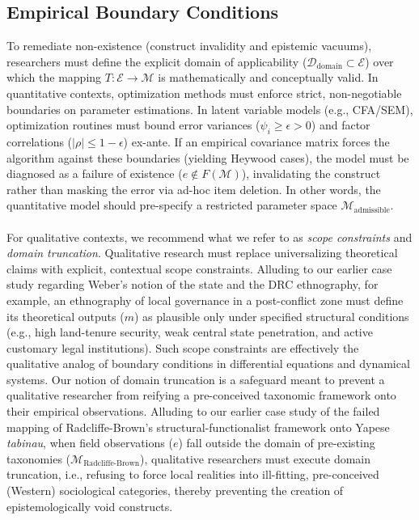 \documentclass{article}
\theoremstyle{definition}
\begin{document}
\subsection{Empirical Boundary Conditions}

To remediate non-existence (construct invalidity and epistemic vacuums), researchers must define the explicit domain of applicability ($\mathcal{D}_{\text{domain}} \subset \mathcal{E}$) over which the mapping $T: \mathcal{E} \to \mathcal{M}$ is mathematically and conceptually valid. In quantitative contexts, optimization methods must enforce strict, non-negotiable boundaries on parameter estimations. In latent variable models (e.g., CFA/SEM), optimization routines must bound error variances ($\psi_i \ge \epsilon > 0$) and factor correlations ($\vert{}\rho\vert{} \le 1 - \epsilon$) ex-ante. If an empirical covariance matrix forces the algorithm against these boundaries (yielding Heywood cases), the model must be diagnosed as a failure of existence ($e \notin F(\mathcal{M})$), invalidating the construct rather than masking the error via ad-hoc item deletion. In other words, the quantitative model should pre-specify a restricted parameter space $\mathcal{M}_{\text{admissible}}$. \\
\\
For qualitative contexts, we recommend what we refer to as \textit{scope constraints} and \textit{domain truncation}. Qualitative research must replace universalizing theoretical claims with explicit, contextual scope constraints. Alluding to our earlier case study regarding Weber's notion of the state and the DRC ethnography, for example, an ethnography of local governance in a post-conflict zone must define its theoretical outputs ($m$) as plausible only under specified structural conditions (e.g., high land-tenure security, weak central state penetration, and active customary legal institutions). Such scope constraints are effectively the qualitative analog of boundary conditions in differential equations and dynamical systems. Our notion of domain truncation is a safeguard meant to prevent a qualitative researcher from reifying a pre-conceived taxonomic framework onto their empirical observations. Alluding to our earlier case study of the failed mapping of Radcliffe-Brown's structural-functionalist framework onto Yapese \textit{tabinau}, when field observations ($e$) fall outside the domain of pre-existing taxonomies ($\mathcal{M}_{\text{Radcliffe-Brown}}$), qualitative researchers must execute domain truncation, i.e., refusing to force local realities into ill-fitting, pre-conceived (Western) sociological categories, thereby preventing the creation of epistemologically void constructs.
\end{document}
